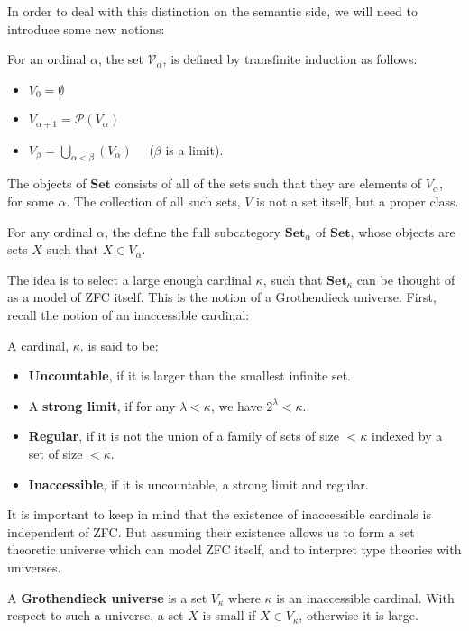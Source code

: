 \documentclass[a4paper,english]{lipics-v2018}
\begin{document}
In order to deal with this distinction on the semantic side, we will need to introduce some new notions:
\begin{definition}For an ordinal $\alpha$, the set $\mathcal{V}_{\alpha}$, is defined by transfinite induction as follows:
  \begin{itemize}
  \item $V_0 = \emptyset$
  \item $V_{\alpha + 1} = \mathcal{P}(V_\alpha)$
  \item $V_{\beta} = \bigcup_{\alpha < \beta}(V_\alpha) \quad $ ($\beta$ is a limit).
  \end{itemize}
\end{definition}
The objects of $\mathbf{Set}$ consists of all of the sets such that they are elements of $V_\alpha$, for some $\alpha$. The collection of all such sets, $V$ is not a set itself, but a proper class.
\begin{definition}
  For any ordinal $\alpha$, the define the full subcategory $\mathbf{Set}_\alpha$ of $\mathbf{Set}$, whose objects are sets $X$ such that $X \in V_\alpha$. 
\end{definition}
The idea is to select a large enough cardinal $\kappa$, such that $\mathbf{Set}_\kappa$ can be thought of as a model of ZFC itself. This is the notion of a Grothendieck universe. First, recall the notion of an inaccessible cardinal:
\begin{definition}A cardinal, $\kappa$. is said to be:
  \begin{itemize}
  \item \textbf{Uncountable}, if it is larger than the smallest infinite set.
  \item A \textbf{strong limit}, if for any $\lambda < \kappa$, we have $2^\lambda < \kappa$.
  \item \textbf{Regular}, if it is not the union of a family of sets of size  $<\kappa$ indexed by a set of size $< \kappa$.
  \item \textbf{Inaccessible}, if it is uncountable, a strong limit and regular.
  \end{itemize}
\end{definition}
It is important to keep in mind that the existence of inaccessible cardinals is independent of ZFC. But assuming their existence allows us to form a set theoretic universe which can model ZFC itself, and to interpret type theories with universes.
\begin{definition}A \textbf{Grothendieck universe} is a set $V_\kappa$ where $\kappa$ is an inaccessible cardinal. With respect to such a universe, a set $X$ is small if $X \in V_\kappa$, otherwise it is large.
\end{definition}
\end{document}
